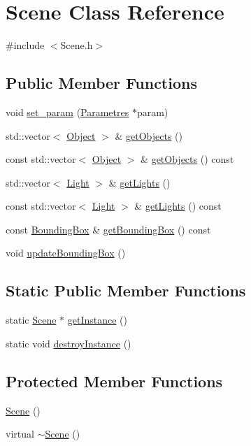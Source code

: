 \hypertarget{class_scene}{
\section{Scene Class Reference}
\label{class_scene}
}


{\ttfamily \#include $<$Scene.h$>$}

\subsection*{Public Member Functions}
\begin{DoxyCompactItemize}
\item 
void \hyperlink{class_scene_a3406376bc6366bdcc1725c389fd06c9f}{set\_\-param} (\hyperlink{class_parametres}{Parametres} $\ast$param)
\item 
std::vector$<$ \hyperlink{class_object}{Object} $>$ \& \hyperlink{class_scene_a20c231c3b2a4f04d7f2665f7bdd67c4b}{getObjects} ()
\item 
const std::vector$<$ \hyperlink{class_object}{Object} $>$ \& \hyperlink{class_scene_ab71d7b7035a0e67bc51154cb98089488}{getObjects} () const 
\item 
std::vector$<$ \hyperlink{class_light}{Light} $>$ \& \hyperlink{class_scene_a40077f3e775c7cbb74c2a7a69d159582}{getLights} ()
\item 
const std::vector$<$ \hyperlink{class_light}{Light} $>$ \& \hyperlink{class_scene_a25c81d0cd7c378a1f634ca2f241a9a33}{getLights} () const 
\item 
const \hyperlink{class_bounding_box}{BoundingBox} \& \hyperlink{class_scene_a207ede2c140b6ab80992aa36f8a5b2fa}{getBoundingBox} () const 
\item 
void \hyperlink{class_scene_ae969181c5f4ae4ffd8d48956af1fa26f}{updateBoundingBox} ()
\end{DoxyCompactItemize}
\subsection*{Static Public Member Functions}
\begin{DoxyCompactItemize}
\item 
static \hyperlink{class_scene}{Scene} $\ast$ \hyperlink{class_scene_ae4f764527c8b962eba443129e023492c}{getInstance} ()
\item 
static void \hyperlink{class_scene_ab03c74268e0dc459804753552f0eed36}{destroyInstance} ()
\end{DoxyCompactItemize}
\subsection*{Protected Member Functions}
\begin{DoxyCompactItemize}
\item 
\hyperlink{class_scene_ad10176d75a9cc0da56626f682d083507}{Scene} ()
\item 
virtual \hyperlink{class_scene_a3b8cec2e32546713915f8c6303c951f1}{$\sim$Scene} ()
\end{DoxyCompactItemize}


